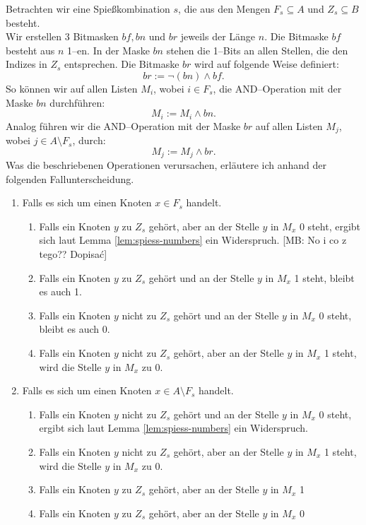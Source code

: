 \documentclass[a4paper,10pt,ngerman]{scrartcl}
\newcommand{\mb}[1]{{\color{red}[MB: #1]}}
\begin{document}
Betrachten wir eine Spießkombination $s$, die aus den Mengen $F_s \subseteq A$ und $Z_s \subseteq B$ besteht.\\
Wir erstellen 3 Bitmasken $bf, bn$ und $br$ jeweils der Länge $n$. Die Bitmaske $bf$ besteht aus $n$ 1--en.
In der Maske $bn$ stehen die 1--Bits an allen Stellen, die den Indizes in $Z_s$ entsprechen.
Die Bitmaske $br$ wird auf folgende Weise definiert:
\[
br := \neg(bn) \land bf.
\]
\noindent So können wir auf allen Listen $M_i$, wobei $i \in F_s$, die AND--Operation mit der Maske $bn$ 
durchführen:
\[
M_i := M_i \land bn.
\]
Analog führen wir die AND--Operation mit der Maske $br$ auf allen Listen $M_j$,
wobei $j \in A \setminus F_s$, durch:
\[
M_j := M_j \land br.
\]
Was die beschriebenen Operationen verursachen, erläutere ich anhand der folgenden Fallunterscheidung.
\begin{enumerate}
  \item Falls es sich um einen Knoten $x \in F_s$ handelt.
  \begin{enumerate}
   \item Falls ein Knoten $y$ zu $Z_s$ gehört, aber an der Stelle $y$ in $M_x$ 0 steht, ergibt sich laut Lemma 
    \ref {lem:spiess-numbers} ein Widerspruch. \mb{No i co z tego?? Dopisać} 
   \item Falls ein Knoten $y$ zu $Z_s$ gehört und an der Stelle $y$ in $M_x$ 1 steht, bleibt es auch 1.
   \item Falls ein Knoten $y$ nicht zu $Z_s$ gehört und an der Stelle $y$ in $M_x$ 0 steht, bleibt es auch 0.
   \item Falls ein Knoten $y$ nicht zu $Z_s$ gehört, aber an der Stelle $y$ in $M_x$ 1 steht, 
    wird die Stelle $y$ in $M_x$ zu 0.
  \end{enumerate}
  \item Falls es sich um einen Knoten $x \in A \setminus F_s$ handelt.
  \begin{enumerate}
    \item Falls ein Knoten $y$ nicht zu $Z_s$ gehört und an der Stelle $y$ in $M_x$ 0 steht, ergibt sich 
      laut Lemma \ref {lem:spiess-numbers} ein Widerspruch.
    \item Falls ein Knoten $y$ nicht zu $Z_s$ gehört, aber an der Stelle $y$ in $M_x$ 1 steht, wird die Stelle 
      $y$ in $M_x$ zu 0.
    \item Falls ein Knoten $y$ zu $Z_s$ gehört, aber an der Stelle $y$ in $M_x$ 1
    \item Falls ein Knoten $y$ zu $Z_s$ gehört, aber an der Stelle $y$ in $M_x$ 0
  \end{enumerate}
\end{enumerate}
\end{document}
